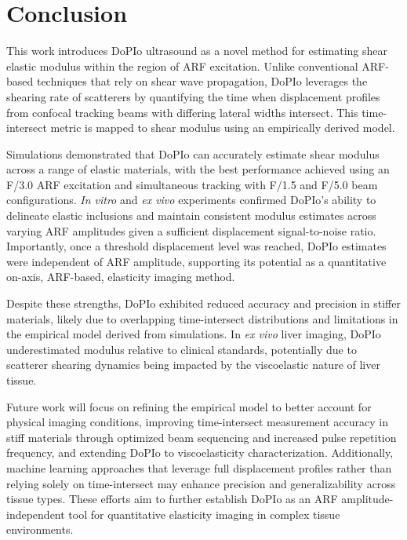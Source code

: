 \section{Conclusion}
\label{sec:conclusion}

This work introduces DoPIo ultrasound as a novel method for estimating shear elastic modulus within the region of ARF excitation. Unlike conventional ARF-based techniques that rely on shear wave propagation, DoPIo leverages the shearing rate of scatterers by quantifying the time when displacement profiles from confocal tracking beams with differing lateral widths intersect. This time-intersect metric is mapped to shear modulus using an empirically derived model.

Simulations demonstrated that DoPIo can accurately estimate shear modulus across a range of elastic materials, with the best performance achieved using an F/3.0 ARF excitation and simultaneous tracking with F/1.5 and F/5.0 beam configurations. \emph{In vitro} and \emph{ex vivo} experiments confirmed DoPIo's ability to delineate elastic inclusions and maintain consistent modulus estimates across varying ARF amplitudes given a sufficient displacement signal-to-noise ratio. Importantly, once a threshold displacement level was reached, DoPIo estimates were independent of ARF amplitude, supporting its potential as a quantitative on-axis, ARF-based, elasticity imaging method.

Despite these strengths, DoPIo exhibited reduced accuracy and precision in stiffer materials, likely due to overlapping time-intersect distributions and limitations in the empirical model derived from simulations. In \emph{ex vivo} liver imaging, DoPIo underestimated modulus relative to clinical standards, potentially due to scatterer shearing dynamics being impacted by the viscoelastic nature of liver tissue.

Future work will focus on refining the empirical model to better account for physical imaging conditions, improving time-intersect measurement accuracy in stiff materials through optimized beam sequencing and increased pulse repetition frequency, and extending DoPIo to viscoelasticity characterization. Additionally, machine learning approaches that leverage full displacement profiles rather than relying solely on time-intersect may enhance precision and generalizability across tissue types. These efforts aim to further establish DoPIo as an ARF amplitude-independent tool for quantitative elasticity imaging in complex tissue environments.
